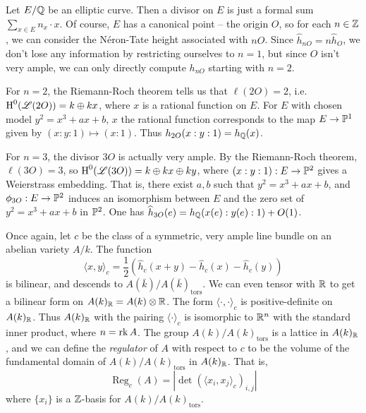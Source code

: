 \documentclass{article}
\begin{document}
\begin{example}
Let $E/\mathbb{Q}$ be an elliptic curve. Then a divisor on $E$ is just a formal sum 
$\sum_{x\in E} n_x\cdot x$. Of course, $E$ has a canonical point -- the origin 
$O$, so for each $n\in \mathbb{Z}$, we can consider the N\'eron-Tate height associated 
with $n O$. Since $\widehat h_{n O}=n \widehat h_O$, we don't lose any 
information by restricting ourselves to $n=1$, but since $O$ isn't very ample, 
we can only directly compute $h_{n O}$ starting with $n=2$. 

For $n=2$, the Riemann-Roch theorem tells us that $\ell(2 O)=2$, i.e. 
$\operatorname{H}^0(\mathscr{L}(2 O)) = k\oplus k x$, where $x$ is a rational function on $E$. For 
$E$ with chosen model $y^2=x^3+a x+b$, $x$ the rational function corresponds to 
the map $E\to \mathbb{P}^1$ given by $(x:y:1)\mapsto (x:1)$. Thus 
$h_{2 O}(x:y:1)=h_{\mathbb{Q}}(x)$. 

For $n=3$, the divisor $3 O$ is actually very ample. By the Riemann-Roch 
theorem, $\ell(3 O)=3$, so $\operatorname{H}^0(\mathscr{L}(3 O))=k\oplus k x\oplus k y$, where 
$(x:y:1):E\to \mathbb{P}^2$ gives a Weierstrass embedding. That is, there exist 
$a,b$ such that $y^2=x^3+a x+b$, and $\phi_{3 O}:E\to \mathbb{P}^2$ induces an 
isomorphism between $E$ and the zero set of $y^2=x^3+a x+b$ in $\mathbb{P}^2$. 
One has $\widehat h_{3 O}(e)=h_{\mathbb{Q}}(x(e):y(e):1)+O(1)$. 
\end{example}

Once again, let $c$ be the class of a symmetric, very ample line bundle on an 
abelian variety $A/k$. The function  
\[
  \langle x,y\rangle_c = \frac 1 2 \left(\widehat h_c(x+y) - \widehat h_c(x)-\widehat h_c(y)\right)
\]
is bilinear, and descends to $A(\bar k)/A(\bar k)_\text{tors}$. 
We can even tensor with $\mathbb{R}$ to get a bilinear form on 
$A(k)_{\mathbb{R}} = A(k)\otimes \mathbb{R}$. The form $\langle \cdot,\cdot\rangle_c$ 
is positive-definite on $A(k)_{\mathbb{R}}$. Thus $A(k)_{\mathbb{R}}$ with the pairing 
$\langle\cdot\rangle_c$ is isomorphic to $\mathbb{R}^n$ with the standard inner 
product, where $n=\operatorname{rk} A$. The group $A(k)/A(k)_\text{tors}$ is a 
lattice in $A(k)_{\mathbb{R}}$, and we can define the \emph{regulator} of $A$ with 
respect to $c$ to be the volume of the fundamental domain of 
$A(k)/A(k)_\text{tors}$ in $A(k)_{\mathbb{R}}$. That is, 
\[
  \operatorname{Reg}_c(A) = \left|\det\left(\langle x_i,x_j\rangle_c\right)_{i,j}\right|
\]
where $\{x_i\}$ is a $\mathbb{Z}$-basis for $A(k)/A(k)_\text{tors}$. 
\end{document}

